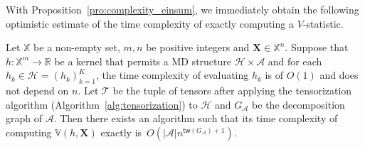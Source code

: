 \documentclass[twoside,11pt]{article}
\newcommand{\Lin}[1]{{\color{purple}{Lin: #1}}}
\newcommand{\libref}[2]{\href{#2}{\texttt{#1}}}
\newcommand{\vstat}{\mathbb{V}}
\newcommand{\samplespace}{\bbX}
\newcommand{\degp}[2]{\deg_{#2}(#1)}
\newcommand{\treewidthp}[1]{\mathsf{tw}(#1)}
\newcommand{\graphform}[1]{G_{#1}}
\newcommand{\less}{O}
\newcommand{\eliminatevg}[2]{\mathsf{elim}_{#1}(#2)}
\def\bbX{\mathbb{X}}
\def\bbR{\mathbb{R}}
\def\calA{\mathcal{A}}
\def\calT{\mathcal{T}}
\def\calH{\mathcal{H}}
\begin{document}
With Proposition~\ref{pro:complexity_einsum}, we immediately obtain the following optimistic estimate of the time complexity of exactly computing a $V$-statistic.

\begin{corollary}\label{pro:complexity_v}
Let $\bbX$ be a non-empty set, $m, n$ be positive integers and $\bm{X} \in \samplespace^n$. Suppose that $h: \bbX^{m} \rightarrow \bbR$ be a kernel that permits a MD structure $\calH \times \calA$ and for each $h_k \in \calH = (h_k)_{k = 1}^{K}$, the time complexity of evaluating $h_k$ is of $O (1)$ and does not depend on $n$. Let $\calT$ be the tuple of tensors after applying the tensorization algorithm (Algorithm~\ref{alg:tensorization}) to $\calH$ and $G_\calA$ be the decomposition graph of $\calA$. Then there exists an algorithm such that its time complexity of computing $\vstat(h,\bm{X})$ exactly is~$\less(|\calA| n^{\treewidthp{G_\calA}+1})$. 
\end{corollary}





\end{document}
